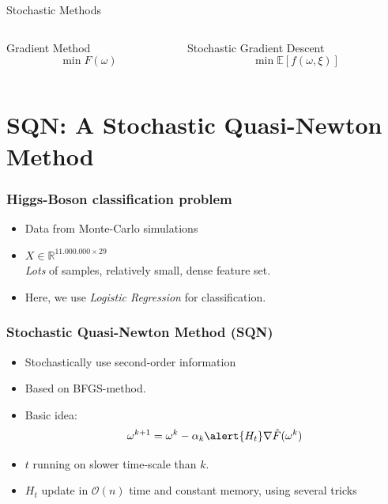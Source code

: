 \documentclass[10pt]{beamer}
\begin{document}
  \begin{frame}{Stochastic Methods}
    \begin{columns}[T]
      \begin{column}{.5\textwidth}
        \centering \alert{Gradient Method}
        $$\min F(\omega) $$

      \end{column}\hfill
      \begin{column}{.5\textwidth}
        \centering \alert{Stochastic Gradient Descent}
        $$\min \mathbb E \left [f(\omega, \xi)\right]$$
      \end{column}
    \end{columns}
  \end{frame}

\section{SQN: A Stochastic Quasi-Newton Method}

  \begin{frame}
    \frametitle{Higgs-Boson classification problem}
      \begin{itemize}
        \item Data from Monte-Carlo simulations
        \item $X\in \mathbb R^{11.000.000 \times 29}$\\\emph{Lots} of samples, relatively small, dense feature set.
        \item Here, we use \emph{Logistic Regression} for classification.
      \end{itemize}
  \end{frame}

  \begin{frame}\frametitle{Stochastic Quasi-Newton Method (SQN)}
      \begin{itemize}
        \item \alert{Stochastically} use second-order information
        \item Based on BFGS-method.
        \pause
        \item Basic idea: $$ \omega^{k+1} = \omega^{k} - \alpha_k \alert{H_t} \nabla \hat F(\omega^{k})$$
        \pause
        \item $t$ running on slower time-scale than $k$. 
        \item $H_t$ update in $\mathcal O(n)$ time and constant memory, using several tricks
      \end{itemize}
  \end{frame}
\end{document}

